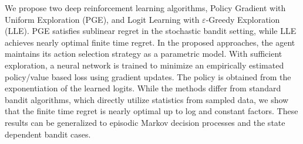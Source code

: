 We propose two deep reinforcement learning algorithms, Policy Gradient with Uniform Exploration (PGE), and Logit Learning with $\varepsilon$-Greedy Exploration (LLE). PGE satisfies sublinear regret in the stochastic bandit setting, while LLE achieves nearly optimal finite time regret. In the proposed approaches, the agent maintains its action selection strategy as a parametric model. With sufficient exploration, a neural network is trained to minimize an empirically estimated policy/value based loss  using gradient updates. The policy is obtained from the exponentiation of the learned logits. While the methods differ from standard bandit algorithms, which directly utilize statistics from sampled data, we show that the finite time regret is nearly optimal up to log and constant factors. These results can be generalized to episodic Markov decision processes and the state dependent bandit cases.